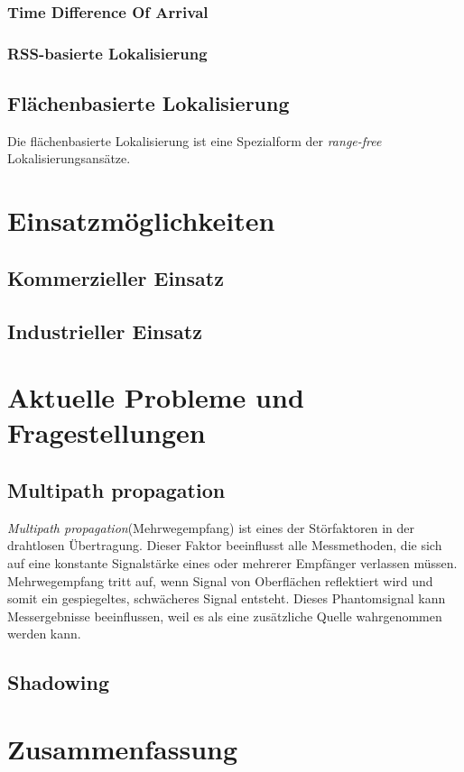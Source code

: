 \documentclass[12pt, a4wide]{scrreprt}
\begin{document}
    \subsection{Time Difference Of Arrival}
    \subsection{RSS-basierte Lokalisierung}    
  \section{Flächenbasierte Lokalisierung}
Die flächenbasierte Lokalisierung ist eine Spezialform der \textit{range-free} Lokalisierungsansätze.
\chapter{Einsatzmöglichkeiten}
  \section{Kommerzieller Einsatz}
  \section{Industrieller Einsatz}

\chapter{Aktuelle Probleme und Fragestellungen}
  \section{Multipath propagation}
\textit{Multipath propagation}(Mehrwegempfang) ist eines der Störfaktoren in der drahtlosen Übertragung. Dieser Faktor beeinflusst alle Messmethoden, die sich auf eine konstante Signalstärke eines oder mehrerer Empfänger verlassen müssen. Mehrwegempfang tritt auf, wenn Signal von Oberflächen reflektiert wird und somit ein gespiegeltes, schwächeres Signal entsteht. Dieses Phantomsignal kann Messergebnisse beeinflussen, weil es als eine zusätzliche Quelle wahrgenommen werden kann.
  \section{Shadowing}

\chapter{Zusammenfassung}

\newpage


\nocite{*}
\end{document}
